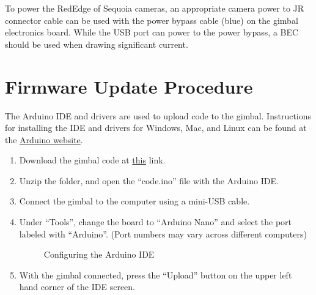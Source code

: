 \documentclass[11pt]{article} %
\begin{document}
To power the RedEdge of Sequoia cameras, an appropriate camera power to JR connector cable can be used with the power bypass cable (blue) on the gimbal electronics board. While the USB port can power to the power bypass, a BEC should be used when drawing significant current.  

\newpage
\section{Firmware Update Procedure}
The Arduino IDE and drivers are used to upload code to the gimbal. Instructions for installing the IDE and drivers for Windows, Mac, and Linux can be found at the \href{https://www.arduino.cc/en/Main/Software}{Arduino website}.

\begin{enumerate}
\item Download the gimbal code at \href{https://github.com/DavisDroneClub/gimbal/raw/master/code.zip}{this} link.
\item Unzip the folder, and open the ``code.ino'' file with the Arduino IDE.
\item Connect the gimbal to the computer using a mini-USB cable.
\item Under ``Tools'', change the board to ``Arduino Nano'' and select the port labeled with ``Arduino''. (Port numbers may vary across different computers)
\begin{figure}[H]
\begin{centering}
 \qquad
{}
\caption{Configuring the Arduino IDE}
\end{centering}
\end{figure}
\item With the gimbal connected, press the ``Upload'' button on the upper left hand corner of the IDE screen.
\end{enumerate}
\end{document}

